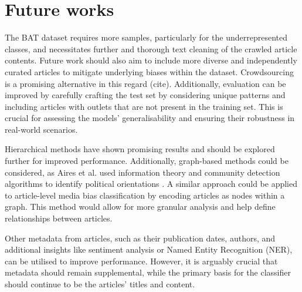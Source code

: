 


\section{Future works}

The BAT dataset requires more samples, particularly for the underrepresented classes, and necessitates further and thorough text cleaning of the crawled article contents. Future work should also aim to include more diverse and independently curated articles to mitigate underlying biases within the dataset. Crowdsourcing is a promising alternative in this regard (cite). Additionally, evaluation can be improved by carefully crafting the test set by considering unique patterns and including articles with outlets that are not present in the training set. This is crucial for assessing the models' generalisability and ensuring their robustness in real-world scenarios.

Hierarchical methods have shown promising results and should be explored further for improved performance. Additionally, graph-based methods could be considered, as Aires et al. used information theory and community detection algorithms to identify political orientations \cite{aires-2020-information}. A similar approach could be applied to article-level media bias classification by encoding articles as nodes within a graph. This method would allow for more granular analysis and help define relationships between articles.

Other metadata from articles, such as their publication dates, authors, and additional insights like sentiment analysis or Named Entity Recognition (NER), can be utilised to improve performance. However, it is arguably crucial that metadata should remain supplemental, while the primary basis for the classifier should continue to be the articles' titles and content.



